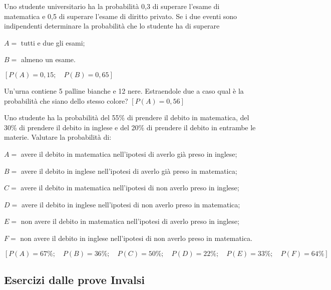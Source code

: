 \begin{esercizio}[\Ast]
 \label{ese:9.62}
Uno studente universitario ha la probabilità 0,3 di superare l'esame di 
matematica e 0,5 di superare l'esame di diritto privato. Se i due eventi sono 
indipendenti determinare la probabilità che lo studente ha di superare
\begin{itemize*}
\item \( A= \) tutti e due gli esami;
\item \( B= \) almeno un esame.
\end{itemize*}
\hfill \(\left[P(A)=0,15; \quad P(B)=0,65\right]\)
\end{esercizio}

\begin{esercizio}[\Ast]
 \label{ese:9.63}
Un'urna contiene 5 palline bianche e 12 nere. Estraendole due a caso qual è la 
probabilità che siano dello stesso colore?
\hfill \(\left[P(A)=0,56\right]\)
\end{esercizio}

\begin{esercizio}[\Ast]
 \label{ese:9.64}
Uno studente ha la probabilità del 55\% di prendere il debito in matematica, del 
30\% di prendere il debito in inglese e del 20\% di prendere il debito in 
entrambe le materie. Valutare la probabilità di:
\begin{itemize*}
\item \( A= \) avere il debito in matematica nell'ipotesi di averlo già preso in 
inglese;
\item \( B= \) avere il debito in inglese nell'ipotesi di averlo già preso in 
matematica;
\item \( C= \) avere il debito in matematica nell'ipotesi di non averlo preso in 
inglese;
\item \( D= \) avere il debito in inglese nell'ipotesi di non averlo preso in 
matematica;
\item \( E= \) non avere il debito in matematica nell'ipotesi di averlo preso in 
inglese;
\item \( F= \) non avere il debito in inglese nell'ipotesi di non averlo preso in 
matematica.
\end{itemize*}
\hfill \(\left[P(A)=67\%; \quad P(B)=36\%; \quad P(C)=50\%; \quad P(D)=22\%; 
\quad P(E)=33\%; \quad P(F)=64\%\right]\)
\end{esercizio}

\subsection*{Esercizi dalle prove Invalsi}

